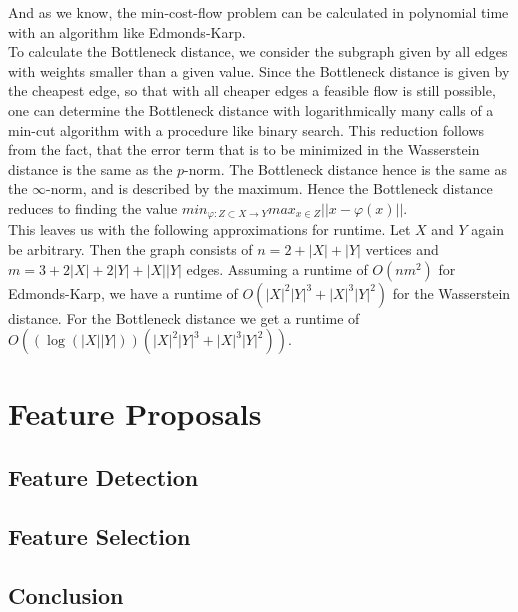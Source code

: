 \documentclass[11pt, a4paper,draft]{report}
\begin{document}
    And as we know, the min-cost-flow problem can be calculated in polynomial time with an algorithm like Edmonds-Karp.\\
    To calculate the Bottleneck distance, we consider the subgraph given by all edges with weights smaller than a given value.
    Since the Bottleneck distance is given by the cheapest edge, so that with all cheaper edges a feasible flow is still possible, one can determine the Bottleneck distance with logarithmically many calls of a min-cut algorithm with a procedure like binary search.
    This reduction follows from the fact, that the error term that is to be minimized in the Wasserstein distance is the same as the $p$-norm.
    The Bottleneck distance hence is the same as the $\infty$-norm, and is described by the maximum.
    Hence the Bottleneck distance reduces to finding the value $min_{\varphi:Z\subset X \rightarrow Y} max_{x\in Z}||x - \varphi(x)||$.\\
    This leaves us with the following approximations for runtime.
    Let $X$ and $Y$ again be arbitrary.
    Then the graph consists of $n=2+|X|+|Y|$ vertices and $m=3+2|X|+2|Y|+|X||Y|$ edges.
    Assuming a runtime of $O(nm^2)$ for Edmonds-Karp, we have a runtime of $O(|X|^2|Y|^3 + |X|^3|Y|^2)$ for the Wasserstein distance.
    For the Bottleneck distance we get a runtime of $O((\log(|X||Y|))(|X|^2|Y|^3 + |X|^3|Y|^2))$.

    \chapter{Feature Proposals}\label{ch:feature-proposals}
    \section{Feature Detection}\label{sec:feature-detection}
    \section{Feature Selection}\label{sec:feature-selection}

    \section*{Conclusion}
\end{document}

